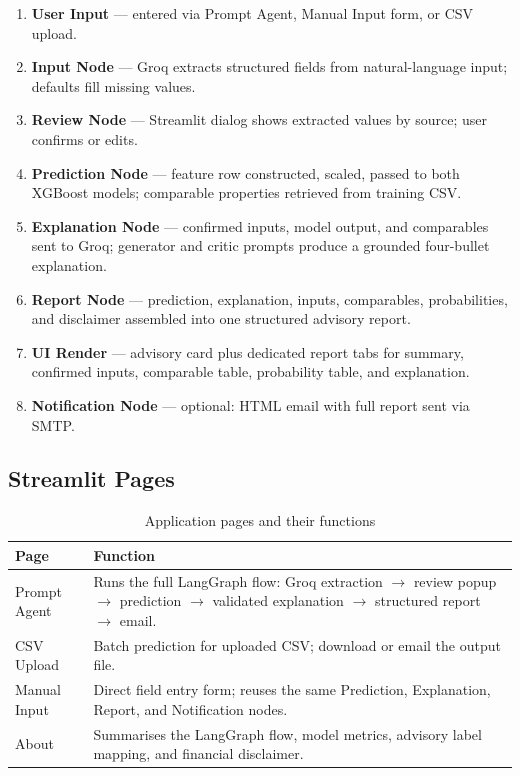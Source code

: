 \documentclass[12pt,a4paper]{article}
\begin{document}
\begin{enumerate}[leftmargin=1.5em]
  \item \textbf{User Input} --- entered via Prompt Agent, Manual Input form, or CSV upload.
  \item \textbf{Input Node} --- Groq extracts structured fields from natural-language input; defaults fill missing values.
  \item \textbf{Review Node} --- Streamlit dialog shows extracted values by source; user confirms or edits.
  \item \textbf{Prediction Node} --- feature row constructed, scaled, passed to both XGBoost models; comparable properties retrieved from training CSV.
  \item \textbf{Explanation Node} --- confirmed inputs, model output, and comparables sent to Groq; generator and critic prompts produce a grounded four-bullet explanation.
  \item \textbf{Report Node} --- prediction, explanation, inputs, comparables, probabilities, and disclaimer assembled into one structured advisory report.
  \item \textbf{UI Render} --- advisory card plus dedicated report tabs for summary, confirmed inputs, comparable table, probability table, and explanation.
  \item \textbf{Notification Node} --- optional: HTML email with full report sent via SMTP.
\end{enumerate}

\subsection{Streamlit Pages}

\begin{table}[H]
\centering
\caption{Application pages and their functions}
\begin{tabularx}{\linewidth}{lX}
\toprule
\textbf{Page} & \textbf{Function} \\
\midrule
Prompt Agent  & Runs the full LangGraph flow: Groq extraction $\to$ review popup $\to$ prediction $\to$ validated explanation $\to$ structured report $\to$ email. \\
CSV Upload    & Batch prediction for uploaded CSV; download or email the output file. \\
Manual Input  & Direct field entry form; reuses the same Prediction, Explanation, Report, and Notification nodes. \\
About         & Summarises the LangGraph flow, model metrics, advisory label mapping, and financial disclaimer. \\
\bottomrule
\end{tabularx}
\end{table}
\end{document}

